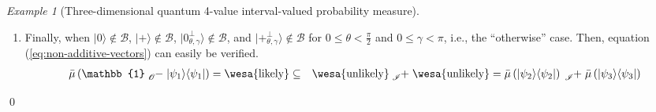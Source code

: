 \documentclass{article}
\theoremstyle{remark}
\newtheorem{example}{Example}
\newcommand{\ket}[1]{|#1\rangle}
\newcommand{\proj}[1]{|#1 \rangle\langle #1 |}
\newcommand{\ps}{\texttt{+}}
\newcommand{\likely}{{\mbox{\wesa{likely}}}}
\newcommand{\unlikely}{{\mbox{\wesa{unlikely}}}}
\newcommand{\rme}{\mathrm{e}}
\newcommand{\rmi}{\mathrm{i}}
\begin{document}
\begin{example}[Three-dimensional quantum 4-value interval-valued
probability measure]
\begin{enumerate}
\[\begin{pmatrix}
\cos\left(\frac{\pi}{2}-\theta\right)
\end{pmatrix}=\rme^{-\rmi\gamma}\ket{\ps_{\frac{\pi}{2}-\theta,\pi+\gamma}^{\perp}}
\]
Because of $0\le\theta<\frac{\pi}{2}$ and $0\le\gamma<\pi$, we have
($0<\theta'=\frac{\pi}{2}-\theta<\frac{\pi}{2}$ and $\pi\le\gamma'=\pi+\gamma<2\pi$)
or $\theta'=\frac{\pi}{2}-\theta=\frac{\pi}{2}$. Similarly, when
$\ket{\psi_{1}}$ is $\ket{\ps_{\theta,\gamma}^{\perp}}$ and $\ket{\ps}\notin\mathcal{B}$,
equation (\ref{eq:non-additive-vectors}) holds.
\item Finally, when $\ket{0}\notin\mathcal{B}$, $\ket{\ps}\notin\mathcal{B}$,
$\ket{0_{\theta,\gamma}^{\perp}}\notin\mathcal{B}$, and $\ket{\ps_{\theta,\gamma}^{\perp}}\notin\mathcal{B}$
for $0\le\theta<\frac{\pi}{2}$ and $0\le\gamma<\pi$, i.e., the ``otherwise''
case. Then, equation (\ref{eq:non-additive-vectors}) can easily be
verified. 
\begin{eqnarray*}
\bar{\mu}\left(\mathbb{1}\tensor*[_{\mathscr{O}}]{-}{}\proj{\psi_{1}}\right)=\likely & \subseteq & \unlikely\tensor*[_{\mathscr{I}}]{+}{}\unlikely=\bar{\mu}\left(\proj{\psi_{2}}\right)\tensor*[_{\mathscr{I}}]{+}{}\bar{\mu}\left(\proj{\psi_{3}}\right)
\end{eqnarray*}
\end{enumerate}
\qed\end{example}
\end{document}
